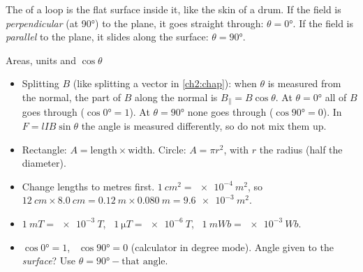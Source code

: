 The  of a loop is the flat surface inside it, like the skin of a drum.
If the field is \emph{perpendicular} (at \ang{90}) to the plane, it goes straight
through: $\theta = \ang{0}$. If the field is \emph{parallel} to the plane, it
slides along the surface: $\theta = \ang{90}$.

\begin{toolkit}{Areas, units and $\cos\theta$}
\begin{itemize}
  \item Splitting $B$ (like splitting a vector in \cref{ch2:chap}): when $\theta$ is
        measured from the normal, the part of $B$ along the normal is
        $B_\parallel = B\cos\theta$. At $\theta = \ang{0}$ all of $B$ goes through
        ($\cos\ang{0} = 1$). At $\theta = \ang{90}$ none goes through
        ($\cos\ang{90} = 0$). In $F = lIB\sin\theta$ the angle is measured
        differently, so do not mix them up.
  \item Rectangle: $A = \text{length} \times \text{width}$. Circle: $A = \pi r^2$, with
        $r$ the radius (half the diameter).
  \item Change lengths to metres first. $\qty{1}{cm^2} = \qty{e-4}{m^2}$, so
        $\qty{12}{cm} \times \qty{8.0}{cm} = \qty{0.12}{m} \times \qty{0.080}{m} = \qty{9.6e-3}{m^2}$.
  \item $\qty{1}{mT} = \qty{e-3}{T}$, \ $\qty{1}{\micro T} = \qty{e-6}{T}$, \
        $\qty{1}{mWb} = \qty{e-3}{Wb}$.
  \item $\cos\ang{0} = 1$, \ $\cos\ang{90} = 0$ (calculator in degree mode). Angle
        given to the \emph{surface}? Use $\theta = \ang{90} - \text{that angle}$.
\end{itemize}
\end{toolkit}

